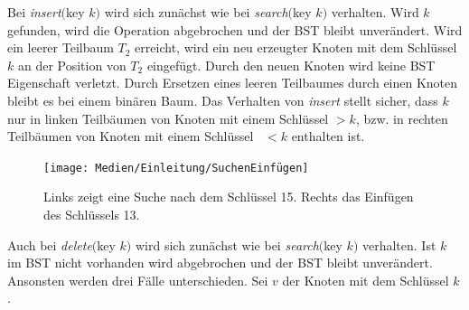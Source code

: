 \documentclass[a4paper,12pt]{article}
\begin{document}
Bei \textit{insert}$($key $k)$  wird sich zunächst wie bei  \textit{search}$($key $k)$ verhalten. Wird $k$ gefunden, wird die Operation abgebrochen und der BST bleibt unverändert. Wird ein leerer Teilbaum $T_2$ erreicht, wird ein neu erzeugter Knoten mit dem Schlüssel $k$ an der Position von $T_2$ eingefügt. Durch den neuen Knoten wird keine BST Eigenschaft verletzt. Durch Ersetzen eines leeren Teilbaumes durch einen Knoten bleibt es bei einem binären Baum. Das Verhalten von  \textit{insert} stellt sicher, dass $k$ nur in linken Teilbäumen von Knoten mit einem Schlüssel $> k$, bzw. in rechten Teilbäumen von Knoten mit einem Schlüssel~ $< k$ enthalten ist.    \\
\begin{figure}[H]
	\centering
	\texttt{[image: Medien/Einleitung/SuchenEinfügen]}
	\caption{Links zeigt eine Suche nach dem Schlüssel 15. Rechts das Einfügen des Schlüssels 13.}
	\label{fig:SuchenEinfügen}
\end{figure}
\noindent Auch bei \textit{delete}$($key $k)$ wird sich zunächst wie bei  \textit{search}$($key $k)$ verhalten. Ist $k$ im BST nicht vorhanden wird abgebrochen und der BST bleibt unverändert. Ansonsten werden drei Fälle unterschieden.
Sei $v$ der Knoten mit dem Schlüssel $k$.
\end{document}
